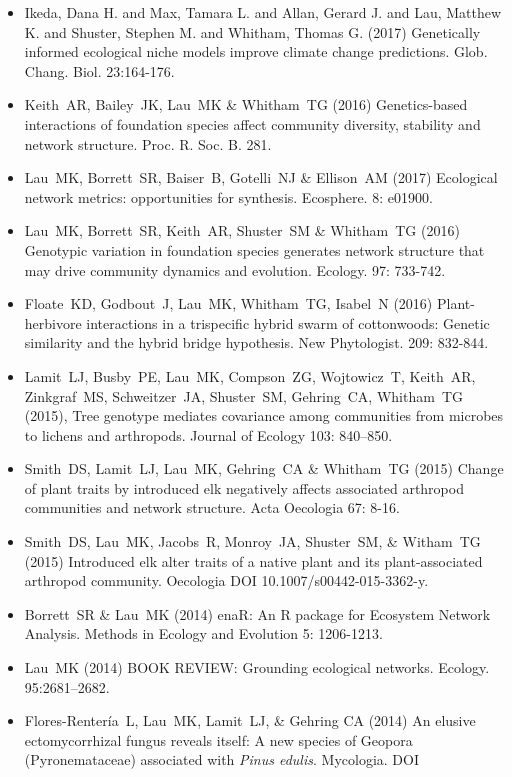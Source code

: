 \documentclass[a4paper]{article}
\begin{document}
\begin{itemize}
\item  
  Ikeda, Dana H. and Max, Tamara L. and Allan, Gerard J. and Lau,
  Matthew K. and Shuster, Stephen M. and Whitham, Thomas G. (2017)
  Genetically informed ecological niche models improve climate change
  predictions. Glob. Chang. Biol. 23:164-176.
\item 
  Keith~AR, Bailey~JK, Lau~MK \& Whitham~TG (2016) Genetics-based
  interactions of foundation species affect community diversity,
  stability and network structure. Proc. R. Soc. B. 281.
\item  
  Lau~MK, Borrett~SR, Baiser~B, Gotelli~NJ \& Ellison~AM (2017)
  Ecological network metrics: opportunities for
  synthesis. Ecosphere. 8: e01900.
\item
  Lau~MK, Borrett~SR, Keith~AR, Shuster~SM \& Whitham~TG (2016)
  Genotypic variation in foundation species generates network
  structure that may drive community dynamics and
  evolution. Ecology. 97: 733-742.
\item
  Floate~KD, Godbout~J, Lau~MK, Whitham~TG, Isabel~N (2016)
  Plant-herbivore interactions in a trispecific hybrid swarm of
  cottonwoods: Genetic similarity and the hybrid bridge
  hypothesis. New Phytologist. 209: 832-844.
\item 
  Lamit~LJ, Busby~PE, Lau~MK, Compson~ZG, Wojtowicz~T, Keith~AR,
  Zinkgraf~MS, Schweitzer~JA, Shuster~SM, Gehring~CA, Whitham~TG
  (2015), Tree genotype mediates covariance among communities from
  microbes to lichens and arthropods. Journal of Ecology 103: 840–850.
\item
  Smith~DS, Lamit~LJ, Lau~MK, Gehring~CA \& Whitham~TG (2015) Change
  of plant traits by introduced elk negatively affects associated
  arthropod communities and network structure. Acta Oecologia 67: 8-16. 
\item 
  Smith~DS, Lau~MK, Jacobs~R, Monroy~JA, Shuster~SM, \& Witham~TG (2015)
  Introduced elk alter traits of a native plant and its plant-associated
  arthropod community. Oecologia DOI 10.1007/s00442-015-3362-y.
\item
  Borrett~SR \& Lau~MK (2014) enaR: An R package for Ecosystem Network
  Analysis. Methods in Ecology and Evolution 5: 1206-1213.
\item
  Lau~MK (2014) BOOK REVIEW: Grounding ecological networks. Ecology.
  95:2681--2682.
\item
  Flores-Rentería~L, Lau~MK, Lamit~LJ, \& Gehring CA (2014) An elusive
  ectomycorrhizal fungus reveals itself: A new species of Geopora
  (Pyronemataceae) associated with \textit{Pinus edulis}. Mycologia. DOI

\end{itemize}
\end{document}
